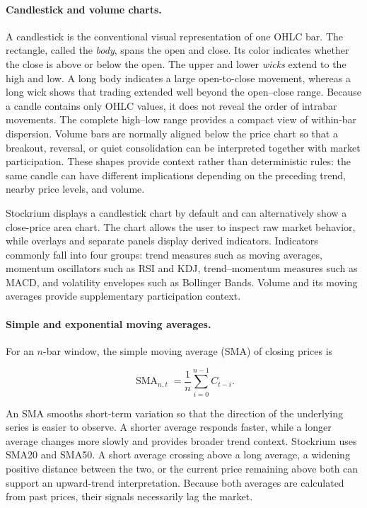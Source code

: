 \paragraph{Candlestick and volume charts.}

A candlestick is the conventional visual representation of one OHLC bar. The rectangle, called the \textit{body}, spans the open and close. Its color indicates whether the close is above or below the open. The upper and lower \textit{wicks} extend to the high and low. A long body indicates a large open-to-close movement, whereas a long wick shows that trading extended well beyond the open--close range. Because a candle contains only OHLC values, it does not reveal the order of intrabar movements. The complete high--low range provides a compact view of within-bar dispersion. Volume bars are normally aligned below the price chart so that a breakout, reversal, or quiet consolidation can be interpreted together with market participation. These shapes provide context rather than deterministic rules: the same candle can have different implications depending on the preceding trend, nearby price levels, and volume.

Stockrium displays a candlestick chart by default and can alternatively show a close-price area chart. The chart allows the user to inspect raw market behavior, while overlays and separate panels display derived indicators. Indicators commonly fall into four groups: trend measures such as moving averages, momentum oscillators such as RSI and KDJ, trend--momentum measures such as MACD, and volatility envelopes such as Bollinger Bands. Volume and its moving averages provide supplementary participation context.

\paragraph{Simple and exponential moving averages.}

For an $n$-bar window, the simple moving average (SMA) of closing prices is

\begin{equation}
    \operatorname{SMA}_{n,t}
      =\frac{1}{n}\sum_{i=0}^{n-1} C_{t-i}.
    \label{eq:technical-sma}
\end{equation}

An SMA smooths short-term variation so that the direction of the underlying series is easier to observe. A shorter average responds faster, while a longer average changes more slowly and provides broader trend context. Stockrium uses SMA20 and SMA50. A short average crossing above a long average, a widening positive distance between the two, or the current price remaining above both can support an upward-trend interpretation. Because both averages are calculated from past prices, their signals necessarily lag the market.

